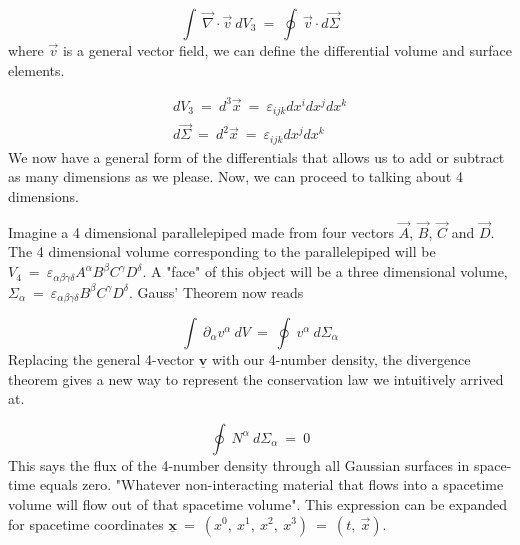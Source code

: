 \begin{equation}
  \int\ \vec{\nabla}\cdot\vec{v}\ dV_3\ =\ \oint\ \vec{v}\cdot d\vec{\Sigma}
\end{equation}
where $\vec{v}$ is a general vector field, we can define the differential volume and surface elements.

\begin{gather}
  dV_3\ =\ d^3\vec{x}\ =\ \varepsilon_{ijk}dx^idx^jdx^k\\
  d\vec{\Sigma}\ =\ d^2\vec{x}\ =\ \varepsilon_{ijk}dx^jdx^k
\end{gather}
We now have a general form of the differentials that allows us to add or subtract as many dimensions as we please.  Now, we can proceed to talking about 4 dimensions.

\hskip 25pt Imagine a 4 dimensional parallelepiped made from four vectors $\vec{A}$, $\vec{B}$,	$\vec{C}$ and $\vec{D}$. The 4 dimensional volume corresponding to the parallelepiped will be $V_4\ =\ \varepsilon_{\alpha\beta\gamma\delta}A^{\alpha}B^{\beta}C^{\gamma}D^{\delta}$.  A "face" of this object will be a three dimensional volume, $\Sigma_{\alpha}\ =\ \varepsilon_{\alpha\beta\gamma\delta}B^{\beta}C^{\gamma}D^{\delta}$.  Gauss' Theorem now reads

\begin{equation}
  \int\ \partial_{\alpha}v^{\alpha}\ dV\ =\ \oint\ v^{\alpha}\ d\Sigma_{\alpha}
\end{equation}
Replacing the general 4-vector $\underline{\mathbf{v}}$ with our 4-number density, the divergence theorem gives a new way to represent the conservation law we intuitively arrived at.

\begin{equation}
  \oint\ N^{\alpha}\ d\Sigma_{\alpha}\ =\ 0
\end{equation}
This says the flux of the 4-number density through all Gaussian surfaces in space-time equals zero. "Whatever non-interacting material that flows into a spacetime volume will flow out of that spacetime volume". This expression can be expanded for spacetime coordinates $\underline{\mathbf{x}}\ =\ (x^0,\ x^1,\ x^2,\ x^3)\ =\ (t,\ \vec{x})$.

